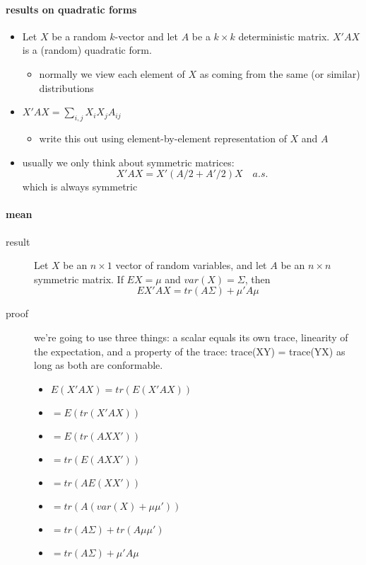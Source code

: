 \paragraph{results on quadratic forms}
\begin{itemize}
\item Let $X$ be a random $k$-vector and let $A$ be a $k \times k$
        deterministic matrix.  $X'A X$ is a (random) quadratic form.
\begin{itemize}
\item normally we view each element of $X$ as coming from the same (or
          similar) distributions
\end{itemize}
\item $X'AX = \sum_{i,j} X_i X_j A_{ij}$
\begin{itemize}
\item write this out using element-by-element representation of $X$ and $A$
\end{itemize}
\item usually we only think about symmetric matrices:
        \[ X' A X = X'(A/2 + A'/2)X \quad a.s.\]
        which is always symmetric
\end{itemize}

\paragraph{mean \citep[Formula in][]{SeL_2003}}
\begin{description}
\item[result] Let $X$ be an $n\times 1$ vector of random variables,
                  and let $A$ be an $n \times n$ symmetric matrix.  If $E
                  X = \mu$ and $var(X) = \Sigma$, then \[ E X'AX = tr(A
                  \Sigma) + \mu'A\mu \]
\item[proof] we're going to use three things: a scalar equals its own
                 trace, linearity of the expectation, and a property of
                 the trace: trace(XY) = trace(YX) as long as both are
                 conformable.
\begin{itemize}
\item $E(X'AX) = tr(E(X'AX))$
\item $= E(tr(X'AX))$
\item $= E(tr(AXX'))$
\item $= tr(E(AXX'))$
\item $= tr(A E(XX'))$
\item $= tr(A (var(X) + \mu\mu'))$
\item $= tr(A\Sigma) + tr(A \mu\mu')$
\item $= tr(A\Sigma) + \mu'A\mu$
\end{itemize}
\end{description}

